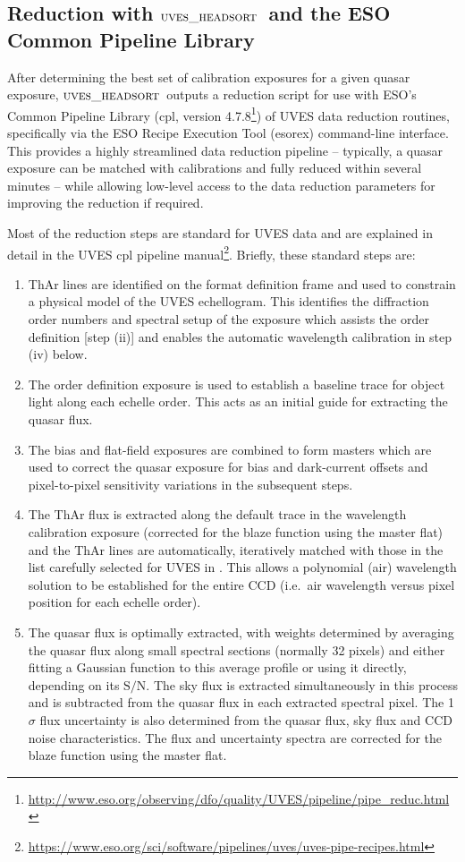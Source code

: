 \documentclass[fleqn,usenatbib,usedcolumn]{mnras}
\newcommand{\SN}{\ensuremath{\textrm{S/N}}}
\newcommand{\headsort}{\ensuremath{\textsc{uves\_headsort}}}
\begin{document}
\subsection{Reduction with \headsort\ and the ESO Common Pipeline Library}\label{ss:cpl}

After determining the best set of calibration exposures for a given quasar exposure, \headsort\ outputs a reduction script for use with ESO's Common Pipeline Library ({\sc cpl}, version 4.7.8\footnote{{\url{http://www.eso.org/observing/dfo/quality/UVES/pipeline/pipe_reduc.html}}}) of UVES data reduction routines, specifically via the ESO Recipe Execution Tool ({\sc esorex}) command-line interface. This provides a highly streamlined data reduction pipeline -- typically, a quasar exposure can be matched with calibrations and fully reduced within several minutes -- while allowing low-level access to the data reduction parameters for improving the reduction if required.

Most of the reduction steps are standard for UVES data and are explained in detail in the UVES {\sc cpl} pipeline manual\footnote{\url{https://www.eso.org/sci/software/pipelines/uves/uves-pipe-recipes.html}}. Briefly, these standard steps are:
\begin{enumerate}
\item ThAr lines are identified on the format definition frame and used to constrain a physical model of the UVES echellogram. This identifies the diffraction order numbers and spectral setup of the exposure which assists the order definition [step (ii)] and enables the automatic wavelength calibration in step (iv) below.
\item The order definition exposure is used to establish a baseline trace for object light along each echelle order. This acts as an initial guide for extracting the quasar flux.
\item The bias and flat-field exposures are combined to form masters which are used to correct the quasar exposure for bias and dark-current offsets and pixel-to-pixel sensitivity variations in the subsequent steps.
\item The ThAr flux is extracted along the default trace in the wavelength calibration exposure (corrected for the blaze function using the master flat) and the ThAr lines are automatically, iteratively matched with those in the list carefully selected for UVES in \citet{Murphy:2007:221}. This allows a polynomial (air) wavelength solution to be established for the entire CCD (i.e.\ air wavelength versus pixel position for each echelle order).
\item The quasar flux is optimally extracted, with weights determined by averaging the quasar flux along small spectral sections (normally 32 pixels) and either fitting a Gaussian function to this average profile or using it directly, depending on its \SN. The sky flux is extracted simultaneously in this process and is subtracted from the quasar flux in each extracted spectral pixel. The 1$\sigma$ flux uncertainty is also determined from the quasar flux, sky flux and CCD noise characteristics. The flux and uncertainty spectra are corrected for the blaze function using the master flat.
\end{enumerate}
\end{document}
